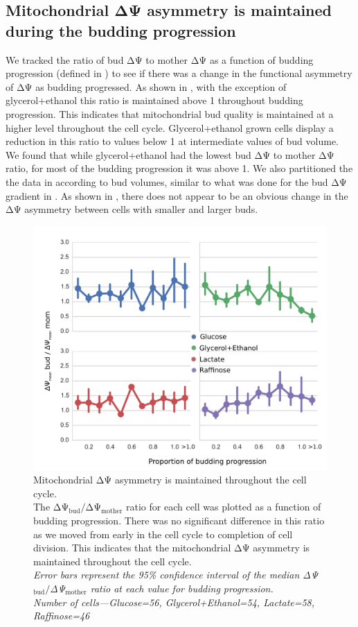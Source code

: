 \subsection{Mitochondrial ΔΨ asymmetry is maintained during the budding progression}
We tracked the ratio of bud ΔΨ to mother ΔΨ as a function of budding progression (defined in ) to see if there was a change in the functional asymmetry of ΔΨ as budding progressed. As shown in , with the exception of glycerol+ethanol this ratio is maintained above 1 throughout budding progression. This indicates that mitochondrial bud quality is maintained at a higher level throughout the cell cycle. Glycerol+ethanol grown cells display a reduction in this ratio to values below 1 at intermediate values of bud volume. We found that while glycerol+ethanol had the lowest bud ΔΨ to mother ΔΨ ratio, for most of the budding progression it was above 1. We also partitioned the the data in  according to bud volumes, similar to what was done for the bud ΔΨ gradient in . As shown in , there does not appear to be an obvious change in the ΔΨ asymmetry between cells with smaller and larger buds.
%
\begin{figure}[htp]
	\centering
    \includegraphics[width=.75\textwidth]{frabud}
    \caption[Mitochondrial ΔΨ asymmetry is maintained throughout the cell cycle]{Mitochondrial ΔΨ asymmetry is maintained throughout the cell cycle.\\The ΔΨ$_\mathrm{bud}/$ΔΨ$_\mathrm{mother}$ ratio for each cell was plotted as a function of budding progression. There was no significant difference in this ratio as we moved from early in the cell cycle to completion of cell division. This indicates that the mitochondrial ΔΨ asymmetry is maintained throughout the cell cycle.\\\emph{Error bars represent the 95\% confidence interval of the median ΔΨ$_\mathrm{bud}/$ΔΨ$_\mathrm{mother}$ ratio at each value for budding progression.\\Number of cells---Glucose=56, Glycerol+Ethanol=54, Lactate=58, Raffinose=46}}\label{fig:frabud}
\end{figure}

